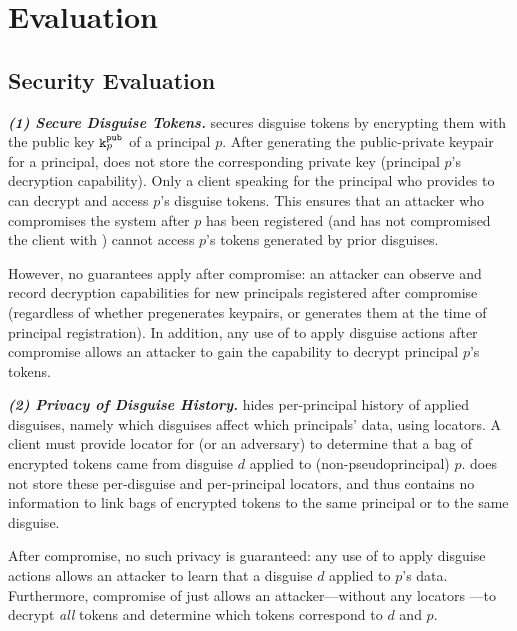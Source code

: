 \section{Evaluation}
\subsection{Security Evaluation}
\vspace{6pt}\noindent\textbf{\emph{(1) Secure Disguise Tokens.}}
%
\sys secures disguise tokens by encrypting them with the public key $\texttt{\ensuremath{\texttt{k}^{\text{pub}}_{p}}}$ of a principal $p$.
After generating the public-private keypair for a principal, \sys does not store the corresponding
private key  (principal $p$'s decryption capability). Only a client speaking for the
principal who provides  to \sys can decrypt and access $p$'s disguise tokens.
This ensures that an attacker who compromises the system after $p$ has been registered (and has not
compromised the client with ) cannot access $p$'s tokens generated by prior disguises.

However, no guarantees apply after compromise: an attacker can observe and record decryption
capabilities for new principals registered after compromise (regardless of whether \sys pregenerates
keypairs, or generates them at the time of principal registration). In addition, any use of
 to apply disguise actions after compromise allows an attacker to gain the capability to
decrypt principal $p$'s tokens.
%

\vspace{6pt}\noindent\textbf{\emph{(2) Privacy of Disguise History.}}
%
\sys hides per-principal history of applied disguises, namely which disguises affect which
principals' data, using locators. A client must provide locator  for \sys (or an
adversary) to determine that a bag of encrypted tokens came from disguise $d$ applied to
(non-pseudoprincipal) $p$. \sys does not store these per-disguise and per-principal locators, and
thus contains no information to link bags of encrypted tokens to the same principal or to the
same disguise.

After compromise, no such privacy is guaranteed: any use of  to apply disguise actions
allows an attacker to learn that a disguise $d$ applied to $p$'s data. Furthermore, 
compromise of just  allows an attacker---without any locators ---to decrypt \emph{all} tokens and
determine which tokens correspond to $d$ and $p$.

